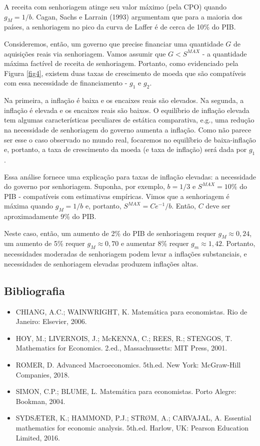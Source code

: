 \documentclass[preprintnumbers,nofootinbib,amsmath,amssymb,12pt]{article}
\begin{document}
A receita com senhoriagem atinge seu valor máximo (pela CPO) quando $g_M = 1/b$. Cagan, Sachs e Larrain (1993) argumentam que para a maioria dos países, a senhoriagem no pico da curva de Laffer é de cerca de 10\% do PIB.

Consideremos, então, um governo que precise financiar uma quantidade $G$ de aquisições reais via senhoriagem. Vamos assumir que $G < S^{MAX}$ - a quantidade máxima factível de receita de senhoriagem. Portanto, como evidenciado pela Figura \ref{fig4}, existem duas taxas de crescimento de moeda que são compatíveis com essa necessidade de financiamento - $g_1$ e $g_2$.

Na primeira, a inflação é baixa e os encaixes reais são elevados. Na segunda, a inflação é elevada e os encaixes reais são baixos. O equilíbrio de inflação elevada tem algumas características peculiares de estática comparativa, e.g., uma redução na necessidade de senhoriagem do governo aumenta a inflação. Como não parece ser esse o caso observado no mundo real, focaremos no equilíbrio de baixa-inflação e, portanto, a taxa de crescimento da moeda (e taxa de inflação) será dada por $g_1$.

Essa análise fornece uma explicação para taxas de inflação elevadas: a necessidade do governo por senhoriagem. Suponha, por exemplo, $b = 1/3$ e $S^{MAX} = 10\%$ do PIB - compatíveis com estimativas empíricas. Vimos que a senhoriagem é máxima quando $g_M = 1/b$ e, portanto, $S^{MAX} = Ce^{-1}/b$. Então, $C$ deve ser aproximadamente 9\% do PIB.

Neste caso, então, um aumento de 2\% do PIB de senhoriagem requer $g_M \approx 0,24$, um aumento de 5\% requer $g_M \approx 0,70$ e aumentar 8\% requer $g_m \approx 1,42$. Portanto, necessidades moderadas de senhoriagem podem levar a inflações substanciais, e necessidades de senhoriagem elevadas produzem inflações altas.

\subsection{Bibliografia}
\begin{itemize}
    \item CHIANG, A.C.; WAINWRIGHT, K. Matemática para economistas. Rio de Janeiro: Elsevier, 2006.
    \item HOY, M.; LIVERNOIS, J.; McKENNA, C.; REES, R.; STENGOS, T. Mathematics for Economics. 2.ed., Massachussetts: MIT Press, 2001.
    \item ROMER, D. Advanced Macroeconomics. 5th.ed. New York: McGraw-Hill Companies, 2018.
    \item SIMON, C.P.; BLUME, L. Matemática para economistas. Porto Alegre: Bookman, 2004.
    \item SYDSÆTER, K.; HAMMOND, P.J.; STRØM, A.; CARVAJAL, A. Essential mathematics for economic analysis. 5th.ed. Harlow, UK: Pearson Education Limited, 2016.
\end{itemize}
\end{document}
